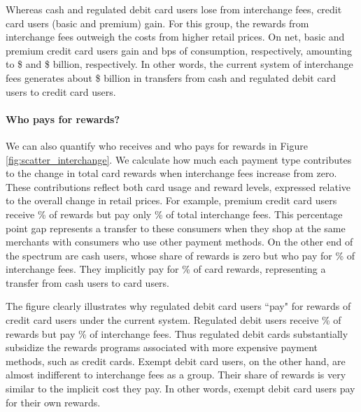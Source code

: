 \documentclass[main.tex]{subfiles}
\begin{document}
Whereas cash and regulated debit card users lose from interchange fees, credit card users (basic and premium) gain.
For this group, the rewards from interchange fees outweigh the costs from higher retail prices.
On net, basic and premium credit card users gain  and  bps of consumption, respectively, amounting to \$ and \$ billion, respectively.
In other words, the current system of interchange fees generates about \$ billion in transfers from cash and regulated debit card users to credit card users.

\paragraph{Who pays for rewards?} 
We can also quantify who receives and who pays for rewards in Figure \ref{fig:scatter_interchange}.
We calculate how much each payment type contributes to the change in total card rewards when interchange fees increase from zero.
These contributions reflect both card usage and reward levels, expressed relative to the overall change in retail prices.
For example, premium credit card users receive \% of rewards but pay only \% of total interchange fees.
This  percentage point gap represents a transfer to these consumers when they shop at the same merchants with consumers who use other payment methods.
On the other end of the spectrum are cash users, whose share of rewards is zero but who pay for \% of interchange fees.
They implicitly pay for \% of card rewards, representing a transfer from cash users to card users.

The figure clearly illustrates why regulated debit card users ``pay" for rewards of credit card users under the current system.
Regulated debit users receive \% of rewards but pay \% of interchange fees.
Thus regulated debit cards substantially subsidize the rewards programs associated with more expensive payment methods, such as credit cards.
Exempt debit card users, on the other hand, are almost indifferent to interchange fees as a group.
Their share of rewards is very similar to the implicit cost they pay.
In other words, exempt debit card users pay for their own rewards.
\end{document}
